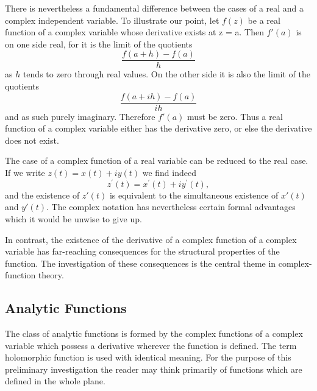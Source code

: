There is nevertheless a fundamental difference between the cases of a real and a complex independent variable. To illustrate our point, let $f(z)$ be a real function of a complex variable whose derivative exists at z = a. Then $f'(a)$ is on one side real, for it is the limit of the quotients
\begin{equation*}
\frac {f (a + h) - f (a)}{h}
\end{equation*}
as $h$ tends to zero through real values. On the other side it is also the limit of the quotients
\begin{equation*}
\frac {f (a + i h) - f (a)}{i h}
\end{equation*}
and as such purely imaginary. Therefore $f'(a)$ must be zero. Thus a real function of a complex variable either has the derivative zero, or else the derivative does not exist.


The case of a complex function of a real variable can be reduced to the real case. If we write $z(t) = x(t) + iy(t)$ we find indeed
\begin{equation*}
z ^ {\prime} (t) = x ^ {\prime} (t) + i y ^ {\prime} (t),
\end{equation*}
and the existence of $z'(t)$ is equivalent to the simultaneous existence of $x'(t)$ and $y'(t)$. The complex notation has nevertheless certain formal advantages which it would be unwise to give up.

In contrast, the existence of the derivative of a complex function of a complex variable has far-reaching consequences for the structural properties of the function. The investigation of these consequences is the central theme in complex-function theory.

\setcounter{section}{1}\setcounter{subsection}{1}\subsection{Analytic Functions}\label{sec:2.1.2}
The class of analytic functions is formed by the complex functions of a complex variable which possess a derivative wherever the function is defined. The term holomorphic function is used with identical meaning. For the purpose of this preliminary investigation the reader may think primarily of functions which are defined in the whole plane.

